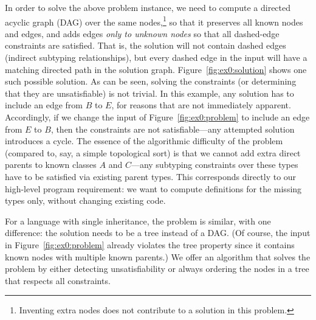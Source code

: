 In order to solve the above problem instance, we need to compute a
directed acyclic graph (DAG) over the same nodes,\footnote{Inventing
extra nodes does not contribute to a solution in this problem.} so
that it preserves all known nodes and edges, and adds edges \emph{only
to unknown nodes} so that all dashed-edge constraints are
satisfied. That is, the solution will not contain dashed edges
(indirect subtyping relationships), but every dashed edge in the input
will have a matching directed path in the solution
graph. Figure~\ref{fig:ex0:solution} shows one such possible solution.
As can be seen, solving the constraints (or determining that they are
unsatisfiable) is not trivial. In this example, any solution has to
include an edge from $B$ to $E$, for reasons that are not immediately
apparent. Accordingly, if we change the input of
Figure~\ref{fig:ex0:problem} to include an edge from $E$ to $B$, then
the constraints are not satisfiable---any attempted solution
introduces a cycle. The essence of the algorithmic difficulty of the
problem (compared to, say, a simple topological sort) is that we
cannot add extra direct parents to known classes $A$ and $C$---any
subtyping constraints over these types have to be satisfied via
existing parent types. This corresponds directly to our high-level
program requirement: we want to compute definitions for the missing
types only, without changing existing code.


For a language with single inheritance, the problem is similar, with
one difference: the solution needs to be a tree instead of a DAG. (Of
course, the input in Figure~\ref{fig:ex0:problem} already violates the
tree property since it contains known nodes with multiple known
parents.) We offer an algorithm that solves the problem by
either detecting unsatisfiability or always ordering the nodes in a
tree that respects all constraints.



